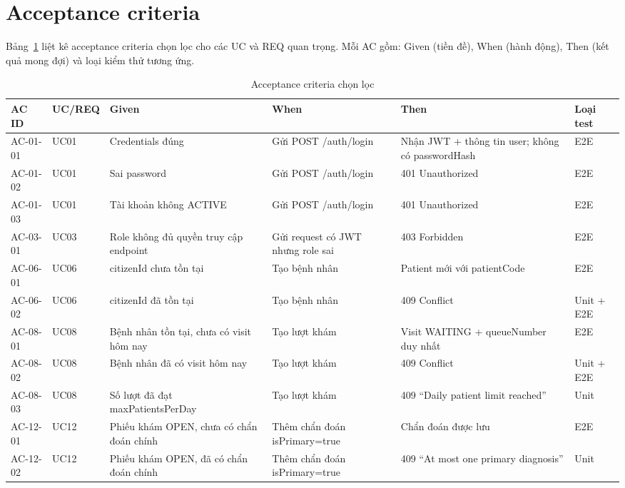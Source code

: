 \section{Acceptance criteria}
\label{sec:srs-ac}

Bảng~\ref{tab:srs-ac} liệt kê acceptance criteria chọn lọc cho các UC và REQ quan trọng. Mỗi AC gồm: Given (tiền đề), When (hành động), Then (kết quả mong đợi) và loại kiểm thử tương ứng.

\begin{longtable}{|p{1.5cm}|p{1.2cm}|p{3.3cm}|p{3.3cm}|p{2.5cm}|p{1.7cm}|}
\caption{Acceptance criteria chọn lọc}
\label{tab:srs-ac}\\
\hline
\textbf{AC ID} & \textbf{UC/REQ} & \textbf{Given} & \textbf{When} & \textbf{Then} & \textbf{Loại test} \\
\hline
\endhead
\hline
\endfoot
AC-01-01 & UC01 & Credentials đúng & Gửi POST /auth/login & Nhận JWT + thông tin user; không có passwordHash & E2E \\
\hline
AC-01-02 & UC01 & Sai password & Gửi POST /auth/login & 401 Unauthorized & E2E \\
\hline
AC-01-03 & UC01 & Tài khoản không ACTIVE & Gửi POST /auth/login & 401 Unauthorized & E2E \\
\hline
AC-03-01 & UC03 & Role không đủ quyền truy cập endpoint & Gửi request có JWT nhưng role sai & 403 Forbidden & E2E \\
\hline
AC-06-01 & UC06 & citizenId chưa tồn tại & Tạo bệnh nhân & Patient mới với patientCode & E2E \\
\hline
AC-06-02 & UC06 & citizenId đã tồn tại & Tạo bệnh nhân & 409 Conflict & Unit + E2E \\
\hline
AC-08-01 & UC08 & Bệnh nhân tồn tại, chưa có visit hôm nay & Tạo lượt khám & Visit WAITING + queueNumber duy nhất & E2E \\
\hline
AC-08-02 & UC08 & Bệnh nhân đã có visit hôm nay & Tạo lượt khám & 409 Conflict & Unit + E2E \\
\hline
AC-08-03 & UC08 & Số lượt đã đạt maxPatientsPerDay & Tạo lượt khám & 409 ``Daily patient limit reached'' & Unit \\
\hline
AC-12-01 & UC12 & Phiếu khám OPEN, chưa có chẩn đoán chính & Thêm chẩn đoán isPrimary=true & Chẩn đoán được lưu & E2E \\
\hline
AC-12-02 & UC12 & Phiếu khám OPEN, đã có chẩn đoán chính & Thêm chẩn đoán isPrimary=true & 409 ``At most one primary diagnosis'' & Unit \\

\end{longtable}
